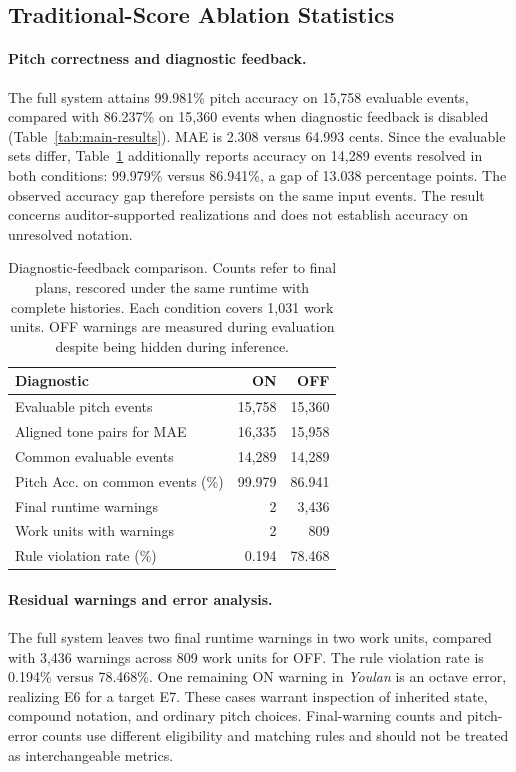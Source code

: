 \subsection{Traditional-Score Ablation Statistics}

\paragraph{Pitch correctness and diagnostic feedback.}
The full system attains 99.981\% pitch accuracy on 15,758 evaluable events, compared with 86.237\% on 15,360 events when diagnostic feedback is disabled (Table~\ref{tab:main-results}). MAE is 2.308 versus 64.993 cents. Since the evaluable sets differ, Table~\ref{tab:warning-ablation} additionally reports accuracy on 14,289 events resolved in both conditions: 99.979\% versus 86.941\%, a gap of 13.038 percentage points. The observed accuracy gap therefore persists on the same input events. The result concerns auditor-supported realizations and does not establish accuracy on unresolved notation.

\begin{table}[t]
\centering\small
\setlength{\tabcolsep}{4pt}
\begin{tabularx}{\linewidth}{@{}Xrr@{}}
\toprule
Diagnostic & ON & OFF \\
\midrule
Evaluable pitch events & 15,758 & 15,360 \\
Aligned tone pairs for MAE & 16,335 & 15,958 \\
Common evaluable events & 14,289 & 14,289 \\
Pitch Acc. on common events (\%) & 99.979 & 86.941 \\
Final runtime warnings & 2 & 3,436 \\
Work units with warnings & 2 & 809 \\
Rule violation rate (\%) & 0.194 & 78.468 \\
\bottomrule
\end{tabularx}
\caption{Diagnostic-feedback comparison. Counts refer to final plans, rescored under the same runtime with complete histories. Each condition covers 1,031 work units. OFF warnings are measured during evaluation despite being hidden during inference.}
\label{tab:warning-ablation}
\end{table}

\paragraph{Residual warnings and error analysis.}
The full system leaves two final runtime warnings in two work units, compared with 3,436 warnings across 809 work units for OFF. The rule violation rate is 0.194\% versus 78.468\%. One remaining ON warning in \emph{Youlan} is an octave error, realizing E6 for a target E7. These cases warrant inspection of inherited state, compound notation, and ordinary pitch choices. Final-warning counts and pitch-error counts use different eligibility and matching rules and should not be treated as interchangeable metrics.

